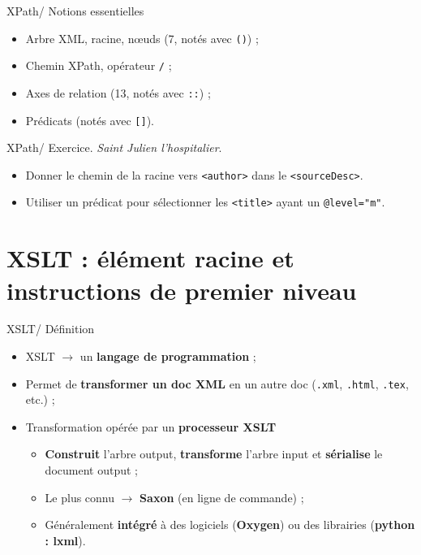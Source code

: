 \documentclass{beamer}
\begin{document}
    \begin{frame}{XPath/ Notions essentielles}
        \Large
        \begin{itemize}
            \item Arbre XML, racine, n\oe uds (7, notés avec \texttt{()}) ;
            \item Chemin XPath, opérateur \texttt{/} ;
            \item Axes de relation (13, notés avec \texttt{::}) ;
            \item Prédicats (notés avec \texttt{[]}).
        \end{itemize}
    \end{frame}

    \begin{frame}{XPath/ Exercice. \textit{Saint Julien l'hospitalier}.}
        \Large
        \begin{itemize}
            \item Donner le chemin de la racine vers \texttt{<author>} dans le \texttt{<sourceDesc>}.
            \bigskip
            \item Utiliser un prédicat pour sélectionner les \texttt{<title>} ayant un \texttt{@level="m"}.
        \end{itemize}
    \end{frame}

    \section{XSLT : élément racine et instructions de premier niveau}

    \begin{frame}{XSLT/ Définition}
        \Large
        \begin{itemize}
            \item XSLT $\rightarrow$ un \textbf{langage de programmation} ;
            \bigskip
            \item Permet de \textbf{transformer un doc XML} en un autre doc  (\texttt{.xml}, \texttt{.html}, \texttt{.tex}, etc.) ;
            \bigskip
            \item Transformation opérée par un \textbf{processeur XSLT}
            \begin{itemize}
                \item \textbf{Construit} l'arbre output, \textbf{transforme} l'arbre input et \textbf{sérialise} le document output ;
                \item Le plus connu $\rightarrow$ \textbf{Saxon} (en ligne de commande) ;
                \item Généralement \textbf{intégré} à des logiciels (\textbf{Oxygen}) ou des librairies (\textbf{python : lxml}).
            \end{itemize}
        \end{itemize}
    \end{frame}
\end{document}
